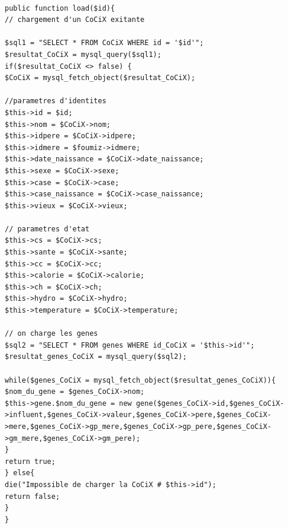 \documentclass[french]{report}
\begin{document}
\begin{lstlisting}[caption={Chargement d'une CoCiX}]

public function load($id){
// chargement d'un CoCiX exitante

$sql1 = "SELECT * FROM CoCiX WHERE id = '$id'";
$resultat_CoCiX = mysql_query($sql1);
if($resultat_CoCiX <> false) {
$CoCiX = mysql_fetch_object($resultat_CoCiX);

//parametres d'identites
$this->id = $id;
$this->nom = $CoCiX->nom;
$this->idpere = $CoCiX->idpere;
$this->idmere = $foumiz->idmere;
$this->date_naissance = $CoCiX->date_naissance;
$this->sexe = $CoCiX->sexe;
$this->case = $CoCiX->case;
$this->case_naissance = $CoCiX->case_naissance;
$this->vieux = $CoCiX->vieux;

// parametres d'etat
$this->cs = $CoCiX->cs;
$this->sante = $CoCiX->sante;
$this->cc = $CoCiX->cc;
$this->calorie = $CoCiX->calorie;
$this->ch = $CoCiX->ch;
$this->hydro = $CoCiX->hydro;
$this->temperature = $CoCiX->temperature;

// on charge les genes
$sql2 = "SELECT * FROM genes WHERE id_CoCiX = '$this->id'";
$resultat_genes_CoCiX = mysql_query($sql2);

while($genes_CoCiX = mysql_fetch_object($resultat_genes_CoCiX)){
$nom_du_gene = $genes_CoCiX->nom;
$this->gene.$nom_du_gene = new gene($genes_CoCiX->id,$genes_CoCiX->influent,$genes_CoCiX->valeur,$genes_CoCiX->pere,$genes_CoCiX->mere,$genes_CoCiX->gp_mere,$genes_CoCiX->gp_pere,$genes_CoCiX->gm_mere,$genes_CoCiX->gm_pere);											}
return true;
} else{
die("Impossible de charger la CoCiX # $this->id");
return false;
}
}
\end{lstlisting}	
\end{document}
